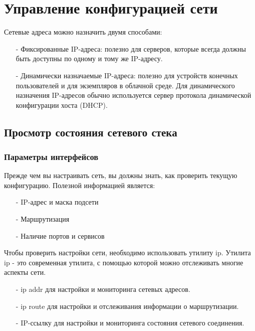 \documentclass[14pt, a4paper]{article}
\begin{document}
\section*{Управление конфигурацией сети} 

Сетевые адреса можно назначить двумя способами:
\begin{itemize}
    \item[-] Фиксированные IP-адреса: полезно для серверов, которые всегда должны быть доступны по
    одному и тому же IP-адресу.
    \item[-] Динамически назначаемые IP-адреса: полезно для устройств конечных пользователей и для
    экземпляров в облачной среде. Для динамического назначения IP-адресов обычно
    используется сервер протокола динамической конфигурации хоста (DHCP). 
\end{itemize}

\subsection*{Просмотр состояния сетевого стека} 

\subsubsection*{Параметры интерфейсов} 

Прежде чем вы настраивать сеть, вы должны знать, как проверить текущую конфигурацию. Полезной
информацией является:
\begin{itemize}
    \item[-] IP-адрес и маска подсети
    \item[-] Маршрутизация
    \item[-] Наличие портов и сервисов 
\end{itemize}

Чтобы проверить настройки сети, необходимо использовать утилиту ip. Утилита ip - это современная
утилита, с помощью которой можно отслеживать многие аспекты сети.
\begin{itemize}
    \item[-] ip addr для настройки и мониторинга сетевых адресов.
    \item[-] ip route для настройки и отслеживания информации о маршрутизации.
    \item[-] IP-ссылку для настройки и мониторинга состояния сетевого соединения. 
\end{itemize}
\end{document}
